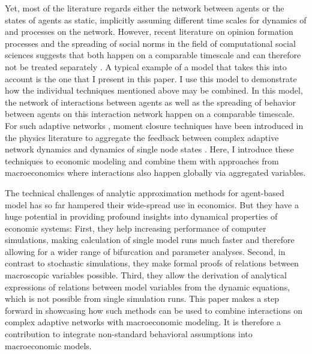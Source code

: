 Yet, most of the literature regards either the network between agents or the states of agents as static, implicitly assuming different time scales for dynamics of and processes on the network.
However, recent literature on opinion formation processes and the spreading of social norms in the field of computational social sciences suggests that both happen on a comparable timescale and can therefore not be treated separately \citep{Gross2008, gross2009adaptive}.
A typical example of a model that takes this into account is the one that I present in this paper. I use this model to demonstrate how the individual techniques mentioned above may be combined. In this model, the network of interactions between agents as well as the spreading of behavior between agents on this interaction network happen on a comparable timescale.
For such adaptive networks \citep{Gross2008}, moment closure techniques have been introduced in the physics literature to aggregate the feedback between complex adaptive network dynamics and dynamics of single node states \citep{Do2009, Demirel2014, Wiedermann2015, Min2017}.
Here, I introduce these techniques to economic modeling and combine them with approaches from macroeconomics where interactions also happen globally via aggregated variables.

The technical challenges of analytic approximation methods for agent-based model has so far hampered their wide-spread use in economics. But they have a huge potential in providing profound insights into dynamical properties of economic systems: First, they help increasing performance of computer simulations, making calculation of single model runs much faster and therefore allowing for a wider range of bifurcation and parameter analyses. Second, in contrast to stochastic simulations, they make formal proofs of relations between macroscopic variables possible. Third, they allow the derivation of analytical expressions of relations between model variables from the dynamic equations, which is not possible from single simulation runs. This paper makes a step forward in showcasing how such methods can be used to combine interactions on complex adaptive networks with macroeconomic modeling. It is therefore a contribution to integrate non-standard behavioral assumptions into macroeconomic models.

